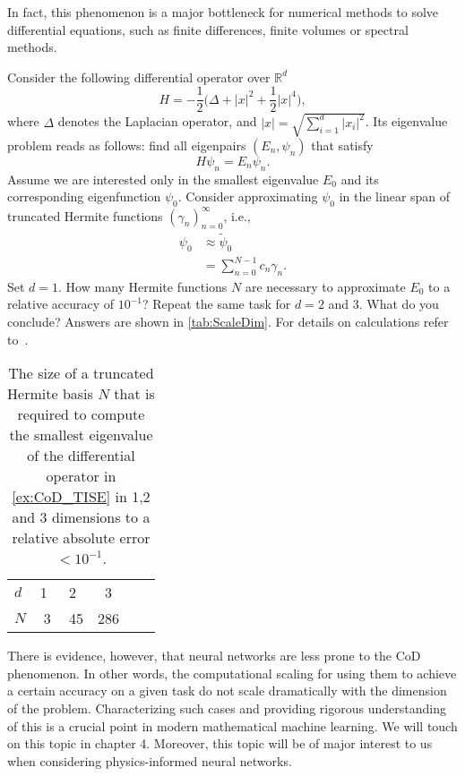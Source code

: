 In fact, this phenomenon is a major bottleneck for numerical methods to solve
differential equations, such as finite differences, finite volumes or spectral
methods. 
\begin{boxedexample} {\theexample}
    \label{ex:CoD_TISE}
Consider the following differential operator over $\mathbb{R}^d$
\begin{equation*}
    H = -\frac{1}{2} \bigl(\Delta + |x|^2 + \frac{1}{2} |x|^4 \bigr), 
\end{equation*}
where $\Delta$ denotes the Laplacian operator, and $|x| = \sqrt{\sum_{i=1}^d |x_i|^2}$. Its eigenvalue problem reads as follows: find all eigenpairs $(E_n, \psi_n)$
that satisfy
\begin{equation*}
    H \psi_n = E_n \psi_n. 
\end{equation*}
Assume we are interested only in the smallest eigenvalue $E_0$ and its
corresponding eigenfunction $\psi_0$. Consider approximating $\psi_0$
in the linear span of truncated Hermite functions $(\gamma_n)_{n=0}^\infty$,
i.e., 
\begin{align*}
    \psi_0 &\approx \tilde{\psi}_0 \\
    &= \sum_{n=0}^{N-1} c_n \gamma_n.
\end{align*}
Set $d=1$. How many Hermite functions $N$ are necessary to approximate $E_0$ to
a relative accuracy of $10^{-1}$? Repeat the same task for $d=2$ and 3. What do you
conclude? Answers are shown in \autoref{tab:ScaleDim}. For details on
calculations refer to~\cite{Saleh:thesis:2023}.
\end{boxedexample}
\begin{table}[t]
	\centering
	\caption[Size of basis to ensure convergence for an increasing problem dimensionality]{The size of a truncated Hermite basis $N$ that is required 
	to compute the smallest eigenvalue of the differential operator in
	\autoref{ex:CoD_TISE} in
	1,2 and 3 dimensions to a relative absolute error $< 10^{-1}$.}
	\begin{tabular}{lccccc}
		\hline\hline
		$d$ &1~&2~ &3		\\
		$N$   & 3 & 45 & 286  \\
		\hline\hline
	\end{tabular}
	\label{tab:ScaleDim}
\end{table}
There is evidence, however, that neural networks are less prone to the CoD
phenomenon. In other words, the computational scaling for using them to achieve
a certain accuracy on a given task do not scale dramatically with the dimension
of the problem. Characterizing such cases and providing rigorous understanding of
this is a crucial point in modern mathematical machine learning. We will touch
on this topic in chapter 4. Moreover, this topic will be of major
interest to us when considering physics-informed neural networks. 

